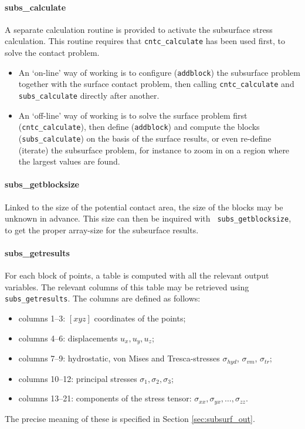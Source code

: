 \documentclass[12pt]{report}
\begin{document}
\paragraph{subs\_calculate}

A separate calculation routine is provided to activate the subsurface
stress calculation. This routine requires that {\tt cntc\_calculate}
has been used first, to solve the contact problem.
\begin{itemize}
\item An `on-line' way of working is to configure ({\tt addblock}) the
        subsurface problem together with the surface contact problem, 
        then calling {\tt cntc\_calculate} and {\tt subs\_calculate} directly
        after another.
\item An `off-line' way of working is to solve the surface problem first
        ({\tt cntc\_calculate}), then define ({\tt addblock}) and compute
        the blocks ({\tt subs\_calculate}) on the basis of the surface
        results, or even re-define (iterate) the subsurface problem, for
        instance to zoom in on a region where the largest values are found.
\end{itemize}

\paragraph{subs\_getblocksize}

Linked to the size of the potential contact area, the size of the
blocks may be unknown in advance. This size can then be inquired with {\tt
subs\_getblocksize}, to get the proper array-size for the subsurface
results.

\paragraph{subs\_getresults}

For each block of points, a table is computed with all the relevant output
variables. The relevant columns of this table may be retrieved using {\tt
subs\_getresults}. The columns are defined as follows:
\begin{itemize}
\item columns 1--3: $[xyz]$ coordinates of the points;
\item columns 4--6: displacements $u_x, u_y, u_z$;
\item columns 7--9: hydrostatic, von Mises and Tresca-stresses 
        $\sigma_{hyd}$, $\sigma_{vm}$, $\sigma_{tr}$;
\item columns 10--12: principal stresses $\sigma_1, \sigma_2, \sigma_3$;
\item columns 13--21: components of the stress tensor: $\sigma_{xx},
        \sigma_{yx}, \ldots, \sigma_{zz}$.
\end{itemize}
The precise meaning of these is specified in Section \ref{sec:subsurf_out}.
\end{document}
